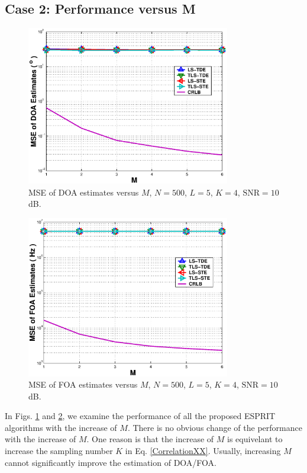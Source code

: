 \documentclass[conference]{IEEEtran}
\begin{document}
\subsection*{Case 2: Performance versus M}
\begin{figure}
\begin{center}
\includegraphics[width=3.5in]{SF_DOAM.eps}
\caption{MSE of DOA estimates versus $M$, $N=500$, $L=5$, $K=4$,
$\mbox{SNR}=10$dB.} \label{SFDOAM}
\end{center}
\end{figure}
\begin{figure}
\begin{center}
\includegraphics[width=3.5in]{SF_FOAM.eps}
\caption{MSE of FOA estimates versus $M$, $N=500$, $L=5$, $K=4$,
$\mbox{SNR}=10$dB.} \label{SFFOAM}
\end{center}
\end{figure}
In Figs. \ref{SFDOAM} and \ref{SFFOAM}, we examine the performance
of all the proposed ESPRIT algorithms with the increase of $M$.
There is no obvious change of the performance with the increase of
$M$. One reason is that the increase of $M$ is equivelant to
increase the sampling number $K$ in Eq. \ref{CorrelationXX}.
Usually, increasing $M$ cannot significantly improve the
estimation of DOA/FOA.
\end{document}

